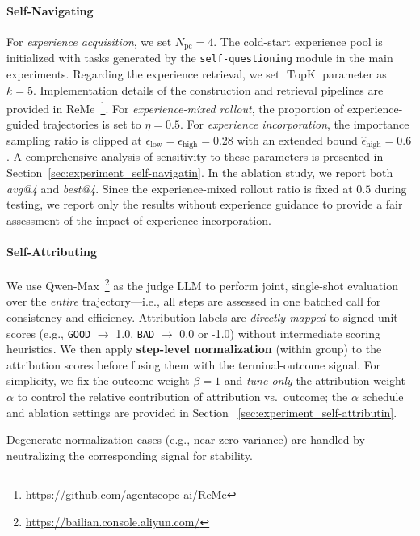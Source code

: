 \paragraph{Self-Navigating}
For \emph{experience acquisition}, we set $N_{\text{pc}}=4$. The cold-start experience pool is initialized with tasks generated by the \texttt{self-questioning} module in the main experiments. Regarding the experience retrieval, we set $\operatorname{TopK}$ parameter as $k=5$. Implementation details of the construction and retrieval pipelines are provided in ReMe~\footnote{\url{https://github.com/agentscope-ai/ReMe}}.
For \emph{experience-mixed rollout}, the proportion of experience-guided trajectories is set to $\eta = 0.5$. For \emph{experience incorporation}, the importance sampling ratio is clipped at $\epsilon_{\text{low}} = \epsilon_{\text{high}} = 0.28$ with an extended bound $\hat{\epsilon}_{\text{high}} = 0.6$. A comprehensive analysis of sensitivity to these parameters is presented in Section~\ref{sec:experiment_self-navigatin}.
In the ablation study, we report both \emph{avg@4} and \emph{best@4}. Since the experience-mixed rollout ratio is fixed at $0.5$ during testing, we report only the results without experience guidance to provide a fair assessment of the impact of experience incorporation.

\paragraph{Self-Attributing} 


We use Qwen-Max~\footnote{\url{https://bailian.console.aliyun.com/}} 
as the judge LLM to perform joint, single-shot evaluation over the \emph{entire} trajectory—i.e., all steps are assessed in one batched call for consistency and efficiency.
Attribution labels are \emph{directly mapped} to signed unit scores (e.g., \texttt{GOOD} $\rightarrow$ 1.0, \texttt{BAD} $\rightarrow$ 0.0 or -1.0)
without intermediate scoring heuristics.
We then apply \textbf{step-level normalization} (within group) to the attribution scores before fusing them with the terminal-outcome signal.
For simplicity, we fix the outcome weight \mbox{$\beta = 1$} and \emph{tune only} the attribution weight $\alpha$ to control the relative contribution of attribution vs.\ outcome; the $\alpha$ schedule and ablation settings are provided in Section ~\ref{sec:experiment_self-attributin}.


Degenerate normalization cases (e.g., near-zero variance) are handled by neutralizing the corresponding signal for stability.


